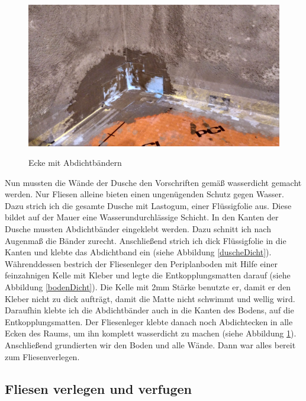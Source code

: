 \begin{figure}[h]
	\begin{center}
		\noindent\includegraphics[scale=0.1]{Resources/Praktikum/IMG_20180801_114836_HDR.jpg}
		\label{eckeDicht}
		\caption{Ecke mit Abdichtbändern}	
	\end{center}
\end{figure}

Nun mussten die Wände der Dusche den Vorschriften gemäß wasserdicht gemacht werden. Nur Fliesen alleine bieten einen ungenügenden Schutz gegen Wasser. Dazu strich ich die gesamte Dusche mit Lastogum, einer Flüssigfolie aus. Diese bildet auf der Mauer eine Wasserundurchlässige Schicht. In den Kanten der Dusche mussten Abdichtbänder eingeklebt werden. Dazu schnitt ich nach Augenmaß die Bänder zurecht. Anschließend strich ich dick Flüssigfolie in die Kanten und klebte das Abdichtband ein (siehe Abbildung \ref{duscheDicht}). Währenddessen bestrich der Fliesenleger den Periplanboden mit Hilfe einer feinzahnigen Kelle mit Kleber und legte die Entkopplungsmatten darauf (siehe Abbildung \ref{bodenDicht}). Die Kelle mit 2mm Stärke benutzte er, damit er den Kleber nicht zu dick aufträgt, damit die Matte nicht schwimmt und wellig wird. Daraufhin klebte ich die Abdichtbänder auch in die Kanten des Bodens, auf die Entkopplungsmatten. Der Fliesenleger klebte danach noch Abdichtecken in alle Ecken des Raums, um ihn komplett wasserdicht zu machen (siehe Abbildung \ref{eckeDicht}). Anschließend grundierten wir den Boden und alle Wände. Dann war alles bereit zum Fliesenverlegen.

\subsection{Fliesen verlegen und verfugen}

